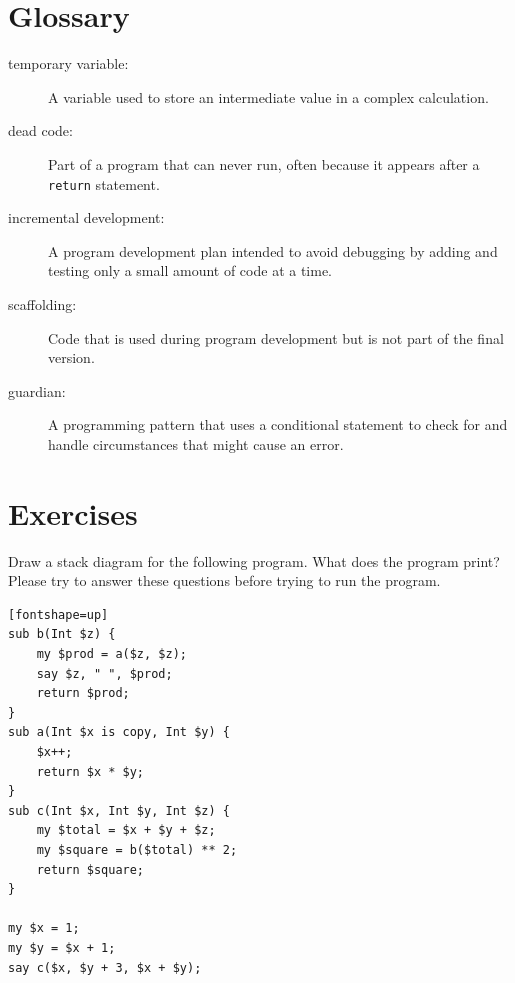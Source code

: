 \section{Glossary}

\begin{description}

\item[temporary variable:]  A variable used to store an intermediate value in
a complex calculation.

\item[dead code:]  Part of a program that can never run, often because
it appears after a {\tt return} statement.

\item[incremental development:]  A program development plan intended to
avoid debugging by adding and testing only
a small amount of code at a time.

\item[scaffolding:]  Code that is used during program development but is
not part of the final version.

\item[guardian:]  A programming pattern that uses a conditional
statement to check for and handle circumstances that
might cause an error.

\end{description}


\section{Exercises}

\begin{exercise}

Draw a stack diagram for the following program.  What does 
the program print? Please try to answer these questions before 
trying to run the program.

\begin{verbatim}[fontshape=up]
sub b(Int $z) {
    my $prod = a($z, $z);
    say $z, " ", $prod;
    return $prod;
}
sub a(Int $x is copy, Int $y) {
    $x++;
    return $x * $y;
}
sub c(Int $x, Int $y, Int $z) {
    my $total = $x + $y + $z;
    my $square = b($total) ** 2;
    return $square;
}

my $x = 1;
my $y = $x + 1;
say c($x, $y + 3, $x + $y);
\end{verbatim}

\end{exercise}


